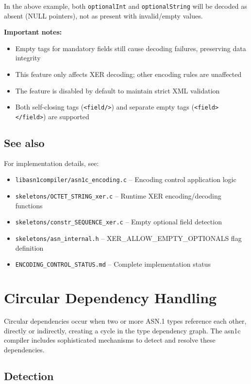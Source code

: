 \documentclass[english,oneside,12pt]{book}
\begin{document}
In the above example, both \texttt{optionalInt} and \texttt{optionalString} will be 
decoded as absent (NULL pointers), not as present with invalid/empty values.

\textbf{Important notes:}
\begin{itemize}
\item Empty tags for mandatory fields still cause decoding failures, preserving data integrity
\item This feature only affects XER decoding; other encoding rules are unaffected
\item The feature is disabled by default to maintain strict XML validation
\item Both self-closing tags (\texttt{<field/>}) and separate empty tags 
(\texttt{<field></field>}) are supported
\end{itemize}

\subsection*{See also}

For implementation details, see:
\begin{itemize}
\item \texttt{libasn1compiler/asn1c\_encoding.c} -- Encoding control application logic
\item \texttt{skeletons/OCTET\_STRING\_xer.c} -- Runtime XER encoding/decoding functions
\item \texttt{skeletons/constr\_SEQUENCE\_xer.c} -- Empty optional field detection
\item \texttt{skeletons/asn\_internal.h} -- XER\_ALLOW\_EMPTY\_OPTIONALS flag definition
\item \texttt{ENCODING\_CONTROL\_STATUS.md} -- Complete implementation status
\end{itemize}

\section{\label{sec:Circular-Dependencies}Circular Dependency Handling}

Circular dependencies occur when two or more ASN.1 types reference each other, 
directly or indirectly, creating a cycle in the type dependency graph. The asn1c 
compiler includes sophisticated mechanisms to detect and resolve these dependencies.

\subsection*{Detection}
\end{document}
